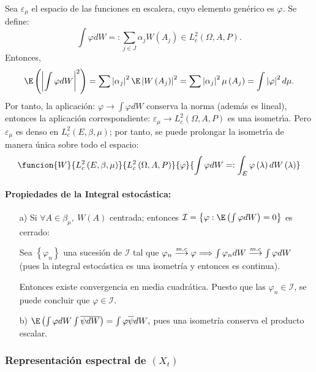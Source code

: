 Sea $\varepsilon_{\mu }$ el espacio de las funciones en escalera, cuyo elemento gen\'{e}rico es $\varphi $. Se define:
\[
\int {\varphi dW} =:\sum_{j\in J} {\alpha_{j}W\left( A_{j} \right)} 
\in L_{c}^{2}\left(\Omega,A,P \right).
\]
Entonces,
\[
\E\left( \left| \int {\varphi dW} \right|^{2} \right)=\sum \left| \alpha_{j} 
\right|^{2} \E\left| W\left( A_{j} \right) \right|^{2}=\sum \left| \alpha 
_{j} \right|^{2} \mu \left( A_{j} \right)=\int \left| \varphi \right|^{2} 
d\mu.
\]
Por tanto, la aplicaci\'{o}n: $\varphi \to \int {\varphi dW} $ conserva la norma (adem\'{a}s es lineal), entonces la aplicaci\'{o}n correspondiente: $\varepsilon_{\mu }\to L_{c}^{2}\left(\Omega,A,P \right)$ es una isometr\'{\i}a. Pero $\varepsilon_{\mu }$ es denso en $L_{c}^{2}\left( E,\beta ,\mu \right)$; por tanto, se puede prolongar la isometr\'{\i}a de 
manera \'{u}nica sobre todo el espacio:
\[
\funcion{W}{L_{c}^{2}\left( E,\beta ,\mu \right)}{L_{c}^{2}\left(\Omega,A,P \right)}{\varphi}{\displaystyle\int {\varphi dW} =:\int_E {\varphi 
\left( \lambda \right)dW\left( \lambda \right)} }
\]

\paragraph{Propiedades de la Integral estoc\'{a}stica:}

\begin{enumerate}
\item[a)] Si $\forall A\in \beta_{\mu },\ W(A)$ centrada; entonces $\mathcal{I}=\left\{ \varphi :\E\left( \int {\varphi dW} \right)=0 \right\}$ es cerrado:

Sea $\left\{ \varphi_{n} \right\}$ una sucesi\'{o}n de $\mathcal{I}$ tal que $\varphi_{n}\buildrel {m.c} \over \longrightarrow \varphi \Longrightarrow \int \varphi_{n} dW\buildrel {m.c} \over \longrightarrow \int {\varphi dW} $ (pues la 
integral estoc\'{a}stica es una isometr\'{i}a y entonces es continua).

Entonces existe convergencia en media cuadr\'{a}tica. Puesto que las $\varphi_{n}\in \mathcal{I}$, se puede concluir que $\varphi \in \mathcal{I}$.

\item[b)] $\E\left( \int {\varphi dW} \int \overline{\psi dW} \right)=\int {\varphi \overline{\psi }dW} ,$ pues una isometr\'{i}a conserva el producto escalar.
\end{enumerate}

\subsubsection{Representaci\'{o}n espectral de $\left(X_{t} \right)$ }

